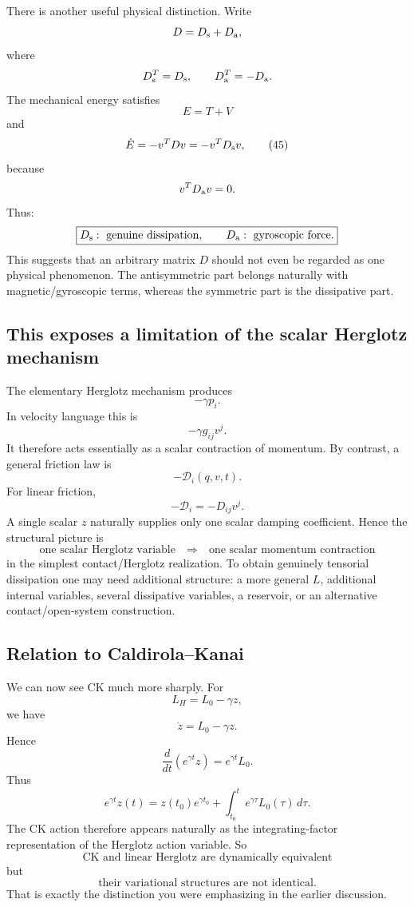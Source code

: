 There is another useful physical distinction.
Write
$$ D=D_{\rm s}+D_{\rm a}, $$
where
$$ D_{\rm s}^T=D_{\rm s}, \qquad D_{\rm a}^T=-D_{\rm a}. $$
The mechanical energy satisfies
$$ E=T+V $$
and
\begin{equation}
 \dot E = -v^TDv = -v^TD_{\rm s}v, \tag{45} 
\end{equation}
because
$$ v^TD_{\rm a}v=0. $$
Thus:
$$ \boxed{ D_{\rm s}:\text{ genuine dissipation}, \qquad D_{\rm a}:\text{ gyroscopic force}. } $$
This suggests that an arbitrary matrix \(D\) should not even be regarded as one physical phenomenon.
The antisymmetric part belongs naturally with magnetic/gyroscopic terms, whereas the symmetric part is the dissipative part.

\subsection{This exposes a limitation of the scalar Herglotz mechanism}

The elementary Herglotz mechanism produces
$$ -\gamma p_i. $$
In velocity language this is
$$ -\gamma g_{ij}v^j. $$
It therefore acts essentially as a scalar contraction of momentum.
By contrast, a general friction law is
$$ -\mathcal D_i(q,v,t). $$
For linear friction,
$$ -\mathcal D_i=-D_{ij}v^j. $$
A single scalar \(z\) naturally supplies only one scalar damping coefficient.
Hence the structural picture is
$$ \boxed{ \text{one scalar Herglotz variable} \quad\Rightarrow\quad \text{one scalar momentum contraction} } $$
in the simplest contact/Herglotz realization.
To obtain genuinely tensorial dissipation one may need additional structure: a more general \(L\), additional internal variables, several dissipative variables, a reservoir, or an alternative contact/open-system construction.

\subsection{Relation to Caldirola–Kanai}

We can now see CK much more sharply.
For
$$ L_H=L_0-\gamma z, $$
we have
$$ \dot z=L_0-\gamma z. $$
Hence
\begin{equation}
 \frac d{dt} \left(e^{\gamma t}z\right) = e^{\gamma t}L_0. \tag{46} 
\end{equation}
Thus
\begin{equation}
 e^{\gamma t}z(t) = z(t_0)e^{\gamma t_0} + \int_{t_0}^{t}e^{\gamma\tau}L_0(\tau)\,d\tau. \tag{47} 
\end{equation}
The CK action therefore appears naturally as the integrating-factor representation of the Herglotz action variable.
So
$$ \boxed{ \text{CK and linear Herglotz are dynamically equivalent} } $$
but
$$ \boxed{ \text{their variational structures are not identical}. } $$
That is exactly the distinction you were emphasizing in the earlier discussion.

